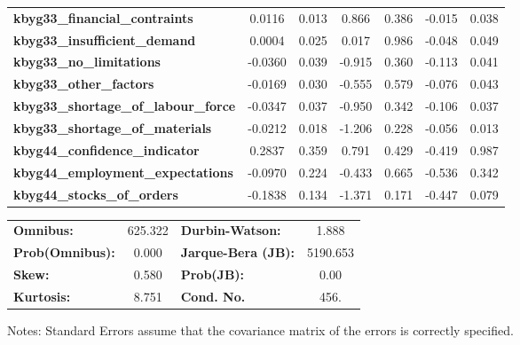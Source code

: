 \begin{center}
\begin{tabular}{lcccccc}
\textbf{kbyg33\_financial\_contraints}       &       0.0116  &        0.013     &     0.866  &         0.386        &       -0.015    &        0.038     \\
\textbf{kbyg33\_insufficient\_demand}        &       0.0004  &        0.025     &     0.017  &         0.986        &       -0.048    &        0.049     \\
\textbf{kbyg33\_no\_limitations}             &      -0.0360  &        0.039     &    -0.915  &         0.360        &       -0.113    &        0.041     \\
\textbf{kbyg33\_other\_factors}              &      -0.0169  &        0.030     &    -0.555  &         0.579        &       -0.076    &        0.043     \\
\textbf{kbyg33\_shortage\_of\_labour\_force} &      -0.0347  &        0.037     &    -0.950  &         0.342        &       -0.106    &        0.037     \\
\textbf{kbyg33\_shortage\_of\_materials}     &      -0.0212  &        0.018     &    -1.206  &         0.228        &       -0.056    &        0.013     \\
\textbf{kbyg44\_confidence\_indicator}       &       0.2837  &        0.359     &     0.791  &         0.429        &       -0.419    &        0.987     \\
\textbf{kbyg44\_employment\_expectations}    &      -0.0970  &        0.224     &    -0.433  &         0.665        &       -0.536    &        0.342     \\
\textbf{kbyg44\_stocks\_of\_orders}          &      -0.1838  &        0.134     &    -1.371  &         0.171        &       -0.447    &        0.079     \\
\bottomrule
\end{tabular}
\begin{tabular}{lclc}
\textbf{Omnibus:}       & 625.322 & \textbf{  Durbin-Watson:     } &    1.888  \\
\textbf{Prob(Omnibus):} &   0.000 & \textbf{  Jarque-Bera (JB):  } & 5190.653  \\
\textbf{Skew:}          &   0.580 & \textbf{  Prob(JB):          } &     0.00  \\
\textbf{Kurtosis:}      &   8.751 & \textbf{  Cond. No.          } &     456.  \\
\bottomrule
\end{tabular}
\end{center}

Notes: \newline
 [1] Standard Errors assume that the covariance matrix of the errors is correctly specified.